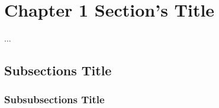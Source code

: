 \section{Chapter 1 Section's Title}
...
\subsection{Subsections Title}
\subsubsection{Subsubsections Title}